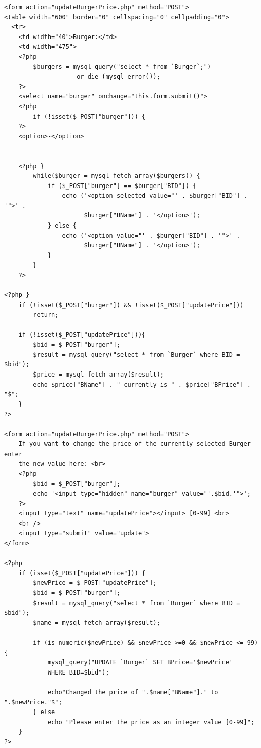 \documentclass[10pt, a4paper]{article}
\begin{document}
\begin{lstlisting}[caption=updateBurgerPrice.php]
<form action="updateBurgerPrice.php" method="POST">
<table width="600" border="0" cellspacing="0" cellpadding="0">
  <tr>
    <td width="40">Burger:</td>
    <td width="475">
    <?php
        $burgers = mysql_query("select * from `Burger`;") 
        			or die (mysql_error());
    ?>
    <select name="burger" onchange="this.form.submit()">
    <?php 
        if (!isset($_POST["burger"])) {   
    ?>
    <option>-</option>
    
    
    <?php }
        while($burger = mysql_fetch_array($burgers)) {
            if ($_POST["burger"] == $burger["BID"]) {
                echo ('<option selected value="' . $burger["BID"] . '">' . 
                      $burger["BName"] . '</option>');
            } else {
                echo ('<option value="' . $burger["BID"] . '">' . 
                      $burger["BName"] . '</option>'); 
            }
        } 
    ?>

<?php }
    if (!isset($_POST["burger"]) && !isset($_POST["updatePrice"]))
        return;
    
    if (!isset($_POST["updatePrice"])){
        $bid = $_POST["burger"];
        $result = mysql_query("select * from `Burger` where BID = $bid");
        $price = mysql_fetch_array($result);
        echo $price["BName"] . " currently is " . $price["BPrice"] . "$";  
    }
?>

<form action="updateBurgerPrice.php" method="POST">
    If you want to change the price of the currently selected Burger enter 
    the new value here: <br>
    <?php   
        $bid = $_POST["burger"];
        echo '<input type="hidden" name="burger" value="'.$bid.'">';
    ?>
    <input type="text" name="updatePrice"></input> [0-99] <br>
    <br />
    <input type="submit" value="update">
</form>

<?php
    if (isset($_POST["updatePrice"])) {
        $newPrice = $_POST["updatePrice"];
        $bid = $_POST["burger"];
        $result = mysql_query("select * from `Burger` where BID = $bid");
        $name = mysql_fetch_array($result);
        
        if (is_numeric($newPrice) && $newPrice >=0 && $newPrice <= 99) {
            mysql_query("UPDATE `Burger` SET BPrice='$newPrice' 
            WHERE BID=$bid");
            
            echo"Changed the price of ".$name["BName"]." to ".$newPrice."$"; 
        } else
            echo "Please enter the price as an integer value [0-99]";
    }
?>
\end{lstlisting}
\end{document}
